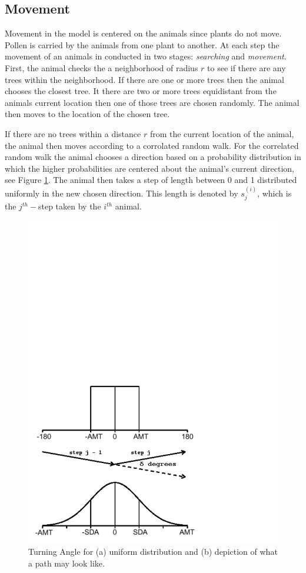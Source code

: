 \documentclass{tran-l}
\theoremstyle{definition}
\theoremstyle{remark}
\numberwithin{equation}{subsection}
\begin{document}
\subsection{Movement}
Movement in the model is centered on the animals since plants do not move.  Pollen is carried by the animals from one plant to another. At each step the movement of an animals in conducted in two stages:  {\it searching} and {\it movement}.  First, the animal checks the a neighborhood of radius $r$ to see if there are any trees within the neighborhood.  If there are one or more trees then the animal chooses the closest tree.  It there are two or more trees equidistant from the animals current location then one of those trees are chosen randomly.  The animal then moves to the location of the chosen tree.

If there are no trees within a distance $r$ from the current location of the animal, the animal then moves according to a corrolated random walk.  For the correlated random walk the animal chooses a direction based on a probability distribution in which the higher probabilities are centered about the animal's current direction, see Figure \ref{TurningAngle}.  The animal then takes a step of length between 0 and 1 distributed uniformly in the new chosen direction.  This length is denoted by $s_j^{(i)}$, which is the $j^{th}-$step taken by the $i^{th}$ animal.
\begin{figure}[H]\label{TurningAngle}
	\begin{center}
	\includegraphics[width=1.0\textwidth]{TADistribution.pdf}
	\end{center}
	\caption{Turning Angle for (a) uniform distribution and (b) depiction
	of what a path may look like.}
\end{figure}
\end{document}
